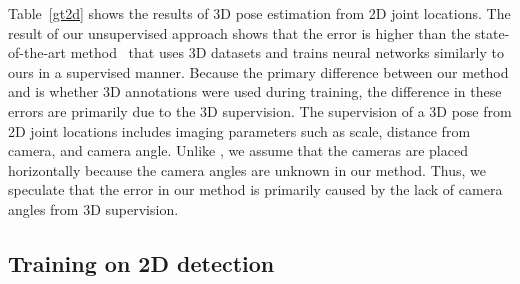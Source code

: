 \documentclass[runningheads]{llncs}
\newcommand{\matsui}[1]{\textbf{\textcolor{cyan}{[\textsc{MATSUI:} #1]}}}
\newcommand{\Tref}[1]{Table~\ref{#1}}
\begin{document}
\Tref{gt2d} shows the results of 3D pose estimation from 2D joint locations.
The result of our unsupervised approach shows that the error is higher than the state-of-the-art method~\cite{martinez20173dbaseline} that uses 3D datasets and trains neural networks similarly to ours in a supervised manner.
Because the primary difference between our method and \cite{martinez20173dbaseline} is whether 3D annotations were used during training, the difference in these errors are primarily due to the 3D supervision.
The supervision of a 3D pose from 2D joint locations includes imaging parameters such as scale, distance from camera, and camera angle.
Unlike \cite{martinez20173dbaseline}, we assume that the cameras are placed horizontally because the camera angles are unknown in our method.
Thus, we speculate that the error in our method is primarily caused by the lack of camera angles from 3D supervision.

\subsection{Training on 2D detection}
\end{document}
